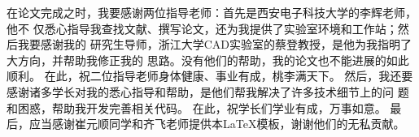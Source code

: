\begin{thanksfor}
在论文完成之时，我要感谢两位指导老师：首先是西安电子科技大学的李辉老师，他不
仅悉心指导我查找文献、撰写论文，还为我提供了实验室环境和工作站；然后我要感谢我的
研究生导师，浙江大学CAD实验室的蔡登教授，是他为我指明了大方向，并帮助我修正我的
思路。没有他们的帮助，我的论文也不能进展的如此顺利。
在此，祝二位指导老师身体健康、事业有成，桃李满天下。
然后，我还要感谢诸多学长对我的悉心指导和帮助，是他们帮我解决了许多技术细节上的问
题和困惑，帮助我开发完善相关代码。
在此，祝学长们学业有成，万事如意。
最后，应当感谢崔元顺同学和齐飞老师提供本LaTeX模板，谢谢他们的无私贡献。
\end{thanksfor}